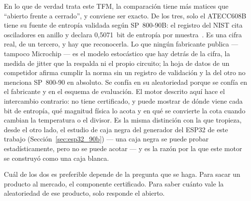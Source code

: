En lo que de verdad trata este TFM, la comparación tiene más matices que
``abierto frente a cerrado'', y conviene ser exacto. De los tres, solo el
ATECC608B tiene su fuente de entropía validada según SP~800-90B: el
registro del NIST cita osciladores en anillo y declara 0,5071~bit de
entropía por muestra~\cite{nist_esv_e46}. Es una cifra real, de un
tercero, y hay que reconocerla. Lo que ningún fabricante publica ---
tampoco Microchip --- es el modelo estocástico que hay detrás de la cifra,
la medida de jitter que la respalda ni el propio circuito; la hoja de
datos de un competidor afirma cumplir la norma sin un registro de
validación y la del otro no menciona SP~800-90 en absoluto. Se confía en
su aleatoriedad porque se confía en el fabricante y en el esquema de
evaluación. El motor descrito aquí hace el intercambio contrario: no tiene
certificado, y puede mostrar de dónde viene cada bit de entropía, qué
magnitud física lo acota y en qué se convierte la cota cuando cambian la
temperatura o el divisor. Es la misma distinción con la que tropieza,
desde el otro lado, el estudio de caja negra del generador del ESP32 de
este trabajo (Sección~\ref{sec:esp32_90b}) --- una caja negra se puede
probar estadísticamente,
pero no se puede acotar --- y es la razón por la que este motor se
construyó como una caja blanca.

Cuál de los dos es preferible depende de la pregunta que se haga. Para
sacar un producto al mercado, el componente certificado. Para saber cuánto
vale la aleatoriedad de ese producto, solo responde el abierto.

